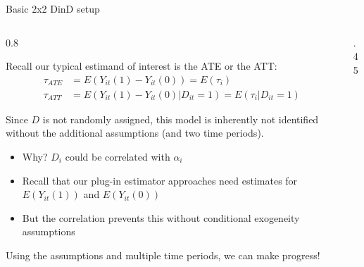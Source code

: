 \documentclass[notes,11pt, aspectratio=169]{beamer}
\newenvironment{wideitemize}{\itemize\addtolength{\itemsep}{10pt}}{\enditemize}
\begin{document}
\begin{frame}{Basic 2x2 DinD setup}
	\begin{columns}[T] %
		\begin{column}{0.8\textwidth}
			\begin{wideitemize}
				\item Recall our typical estimand of interest is the ATE or the ATT:
				\begin{align*}
					\tau_{ATE} & = E(Y_{it}(1) - Y_{it}(0)) = E(\tau_{i})                          \\
					\tau_{ATT} & = E(Y_{it}(1) - Y_{it}(0) | D_{it} = 1) = E(\tau_{i} |D_{it} = 1)
				\end{align*}
				\item Since $D$ is not randomly assigned, this model is inherently not identified without the additional assumptions (and two time periods).
				\begin{itemize}
					\item Why? $D_{i}$ could be correlated with $\alpha_{i}$
					\item Recall that our plug-in estimator approaches need
					      estimates for $E(Y_{it}(1))$ and $E(Y_{it}(0))$
					\item But the correlation prevents this without conditional exogeneity assumptions
				\end{itemize}
				\item Using the assumptions and multiple time periods, we can make progress!
			\end{wideitemize}
		\end{column}%
		\hfill%
		\begin{column}{.45\textwidth}
		\end{column}%
	\end{columns}
\end{frame}
\end{document}
